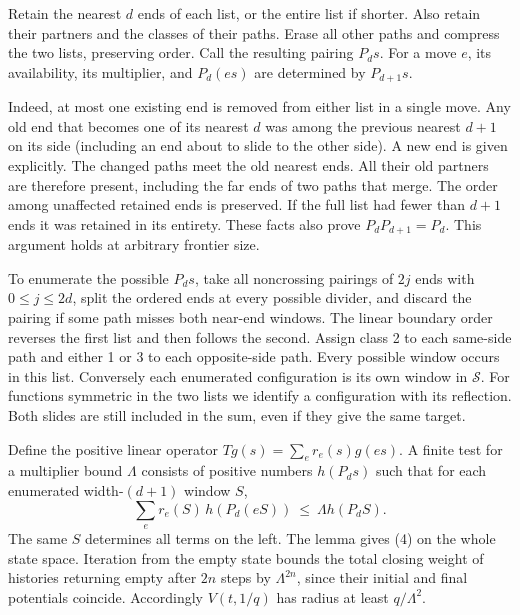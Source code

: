 \begin{lemma}
Retain the nearest \(d\) ends of each list, or the entire list if
shorter. Also retain their partners and the classes of their paths.
Erase all other paths and compress the two lists, preserving order.
Call the resulting pairing \(P_ds\). For a move \(e\), its availability,
its multiplier, and \(P_d(es)\) are determined by \(P_{d+1}s\).
\end{lemma}
Indeed, at most one existing end is removed from either list in a single
move. Any old end that becomes one of its nearest \(d\) was among the
previous nearest \(d+1\) on its side (including an end about to slide
to the other side). A new end is given explicitly. The changed paths
meet the old nearest ends. All their old partners are therefore present,
including the far ends of two paths that merge. The order among
unaffected retained ends is preserved. If the full list had fewer than
\(d+1\) ends it was retained in its entirety. These facts also prove
\(P_dP_{d+1}=P_d\). This argument holds at arbitrary frontier size.

To enumerate the possible \(P_ds\), take all noncrossing pairings
of \(2j\) ends with \(0\le j\le 2d\), split the ordered ends at
every possible divider, and discard the pairing if some path misses
both near-end windows. The linear boundary order reverses the first
list and then follows the second. Assign class 2 to each same-side
path and either 1 or 3 to each opposite-side path. Every possible
window occurs in this list. Conversely each enumerated configuration
is its own window in \(\mathcal S\). For functions symmetric in the
two lists we identify a configuration with its reflection. Both slides
are still included in the sum, even if they give the same target.

Define the positive linear operator \(Tg(s)=\sum_e r_e(s)g(es)\).
A finite test for a multiplier bound \(\Lambda\) consists of positive
numbers \(h(P_ds)\) such that for each enumerated width-\((d+1)\)
window \(S\),
\[
       \sum_e r_e(S)\,h(P_d(eS))\ \le\ \Lambda h(P_dS).                \tag{4}
\]
The same \(S\) determines all terms on the left. The lemma gives (4)
on the whole state space. Iteration from the empty state bounds the
total closing weight of histories returning empty after \(2n\) steps by
\(\Lambda^{2n}\), since their initial and final potentials coincide.
Accordingly \(V(t,1/q)\) has radius at least \(q/\Lambda^2\).

